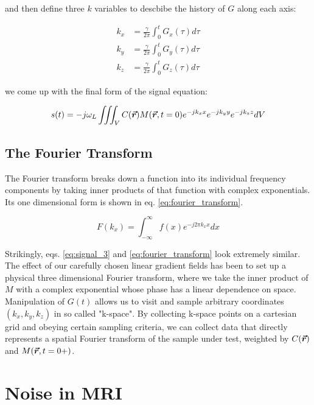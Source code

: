and then define three $k$ variables to descbibe the history of $G$ along each axis:

\begin{equation}\label{k_space}
    \begin{aligned}
        k_x &= \frac{\gamma}{2\pi} \int_0^t G_x(\tau) d\tau\\
        k_y &= \frac{\gamma}{2\pi} \int_0^t G_y(\tau) d\tau\\
        k_z &= \frac{\gamma}{2\pi} \int_0^t G_z(\tau) d\tau
    \end{aligned}
\end{equation}

we come up with the final form of the signal equation:

\begin{equation}\label{eq:signal_3}
    s(t) = - j \omega_L \iiint_V C(\bm{\vec{r}}) M(\bm{\vec{r}},t=0) e^{-j k_x x} e^{-j k_y y} e^{-j k_z z} dV 
\end{equation}

\subsection{The Fourier Transform}
The Fourier transform breaks down a function into its individual frequency components by taking inner products of that
function with complex exponentials. Its one dimensional form is shown in eq. \ref{eq:fourier_transform}.

\begin{equation}\label{eq:fourier_transform}
    F(k_x) = \int_{-\infty}^{\infty} f(x)e^{-j2\pi k_x x} dx
\end{equation}

Strikingly, eqs. \ref{eq:signal_3} and \ref{eq:fourier_transform} look extremely similar. The effect of our carefully
chosen linear gradient fields has been to set up a physical three dimensional Fourier transform, where we take the inner
product of $M$ with a complex exponential whose phase has a linear dependence on space. Manipulation of $G(t)$ allows us
to visit and sample arbitrary coordinates $(k_x,k_y,k_z)$ in so called "k-space".  By collecting k-space points on a
cartesian grid and obeying certain sampling criteria, we can collect data that directly represents a spatial Fourier
transform of the sample under test, weighted by $C(\bm{\vec{r}})$ and $M(\bm{\vec{r}},t=0+)$.

\section{Noise in MRI}
